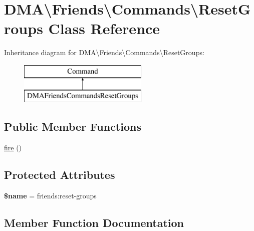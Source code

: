 \hypertarget{classDMA_1_1Friends_1_1Commands_1_1ResetGroups}{}\section{D\+M\+A\textbackslash{}Friends\textbackslash{}Commands\textbackslash{}Reset\+Groups Class Reference}
\label{classDMA_1_1Friends_1_1Commands_1_1ResetGroups}
Inheritance diagram for D\+M\+A\textbackslash{}Friends\textbackslash{}Commands\textbackslash{}Reset\+Groups\+:\begin{figure}[H]
\begin{center}
\leavevmode
\includegraphics[height=2.000000cm]{dc/d80/classDMA_1_1Friends_1_1Commands_1_1ResetGroups}
\end{center}
\end{figure}
\subsection*{Public Member Functions}
\begin{DoxyCompactItemize}
\item 
\hyperlink{classDMA_1_1Friends_1_1Commands_1_1ResetGroups_a1671243f4b929d299357d08490661732}{fire} ()
\end{DoxyCompactItemize}
\subsection*{Protected Attributes}
\begin{DoxyCompactItemize}
\item 
\hypertarget{classDMA_1_1Friends_1_1Commands_1_1ResetGroups_a713919df694ce18df9c2527e833dc858}{}{\bfseries \$name} = \textquotesingle{}friends\+:reset-\/groups\textquotesingle{}\label{classDMA_1_1Friends_1_1Commands_1_1ResetGroups_a713919df694ce18df9c2527e833dc858}

\end{DoxyCompactItemize}


\subsection{Member Function Documentation}
\hypertarget{classDMA_1_1Friends_1_1Commands_1_1ResetGroups_a1671243f4b929d299357d08490661732}{}
